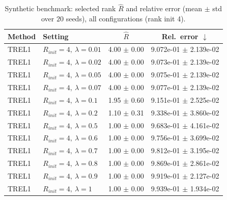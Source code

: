 \begin{table}[t]
\centering
\caption{Synthetic benchmark: selected rank \(\hat R\) and relative error (mean \(\pm\) std over \(20\) seeds), all configurations (rank init 4).}
\label{tab:results_synth_all}
\begin{tabular}{@{}llcc@{}}
\toprule
Method & Setting & \(\hat R\) & Rel.\ error \(\downarrow\) \\ \midrule
TREL1 & \(R_{init}=4,\ \lambda=0.01\) & 4.00 $\pm$ 0.00 & 9.072e-01 $\pm$ 2.139e-02 \\
TREL1 & \(R_{init}=4,\ \lambda=0.02\) & 4.00 $\pm$ 0.00 & 9.073e-01 $\pm$ 2.139e-02 \\
TREL1 & \(R_{init}=4,\ \lambda=0.05\) & 4.00 $\pm$ 0.00 & 9.075e-01 $\pm$ 2.139e-02 \\
TREL1 & \(R_{init}=4,\ \lambda=0.07\) & 4.00 $\pm$ 0.00 & 9.077e-01 $\pm$ 2.139e-02 \\
TREL1 & \(R_{init}=4,\ \lambda=0.1\) & 1.95 $\pm$ 0.60 & 9.151e-01 $\pm$ 2.525e-02 \\
TREL1 & \(R_{init}=4,\ \lambda=0.2\) & 1.10 $\pm$ 0.31 & 9.338e-01 $\pm$ 3.860e-02 \\
TREL1 & \(R_{init}=4,\ \lambda=0.5\) & 1.00 $\pm$ 0.00 & 9.683e-01 $\pm$ 4.161e-02 \\
TREL1 & \(R_{init}=4,\ \lambda=0.6\) & 1.00 $\pm$ 0.00 & 9.756e-01 $\pm$ 3.699e-02 \\
TREL1 & \(R_{init}=4,\ \lambda=0.7\) & 1.00 $\pm$ 0.00 & 9.812e-01 $\pm$ 3.195e-02 \\
TREL1 & \(R_{init}=4,\ \lambda=0.8\) & 1.00 $\pm$ 0.00 & 9.869e-01 $\pm$ 2.861e-02 \\
TREL1 & \(R_{init}=4,\ \lambda=0.9\) & 1.00 $\pm$ 0.00 & 9.919e-01 $\pm$ 2.127e-02 \\
TREL1 & \(R_{init}=4,\ \lambda=1\) & 1.00 $\pm$ 0.00 & 9.939e-01 $\pm$ 1.934e-02 \\
\bottomrule
\end{tabular}
\end{table}